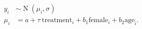 \begin{align*} y_i & \sim \operatorname N(\mu_i, \sigma) \\ \mu_i & = a + \tau\ \text{treatment}_i + b_1 \text{female}_i + b_2 \text{age}_i. \end{align*}
